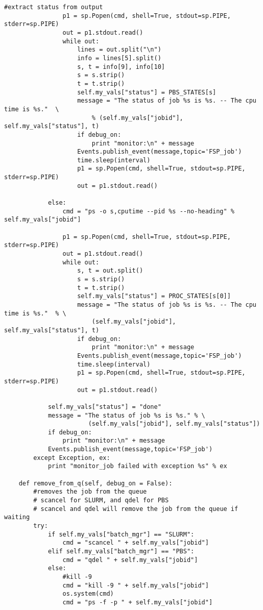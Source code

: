 \begin{lstlisting}[frame=single,
    caption={batch\_mgmt\_script.py}, label=batchscript]
                #extract status from output
                p1 = sp.Popen(cmd, shell=True, stdout=sp.PIPE, stderr=sp.PIPE)
                out = p1.stdout.read()
                while out:
                    lines = out.split("\n")
                    info = lines[5].split()
                    s, t = info[9], info[10]
                    s = s.strip()
                    t = t.strip()
                    self.my_vals["status"] = PBS_STATES[s]
                    message = "The status of job %s is %s. -- The cpu time is %s."  \
                        % (self.my_vals["jobid"], self.my_vals["status"], t)
                    if debug_on:
                        print "monitor:\n" + message
                    Events.publish_event(message,topic='FSP_job')
                    time.sleep(interval)
                    p1 = sp.Popen(cmd, shell=True, stdout=sp.PIPE, stderr=sp.PIPE)
                    out = p1.stdout.read()

            else:
                cmd = "ps -o s,cputime --pid %s --no-heading" %  self.my_vals["jobid"]
                
                p1 = sp.Popen(cmd, shell=True, stdout=sp.PIPE, stderr=sp.PIPE)
                out = p1.stdout.read()
                while out:
                    s, t = out.split()
                    s = s.strip()
                    t = t.strip()
                    self.my_vals["status"] = PROC_STATES[s[0]]
                    message = "The status of job %s is %s. -- The cpu time is %s."  % \
                        (self.my_vals["jobid"], self.my_vals["status"], t)
                    if debug_on:
                        print "monitor:\n" + message
                    Events.publish_event(message,topic='FSP_job')
                    time.sleep(interval)
                    p1 = sp.Popen(cmd, shell=True, stdout=sp.PIPE, stderr=sp.PIPE)
                    out = p1.stdout.read()

            self.my_vals["status"] = "done"
            message = "The status of job %s is %s." % \
                       (self.my_vals["jobid"], self.my_vals["status"])
            if debug_on:
                print "monitor:\n" + message
            Events.publish_event(message,topic='FSP_job')
        except Exception, ex:
            print "monitor_job failed with exception %s" % ex
                
    def remove_from_q(self, debug_on = False):
        #removes the job from the queue
        # scancel for SLURM, and qdel for PBS
        # scancel and qdel will remove the job from the queue if waiting
        try:
            if self.my_vals["batch_mgr"] == "SLURM":
                cmd = "scancel " + self.my_vals["jobid"]
            elif self.my_vals["batch_mgr"] == "PBS":
                cmd = "qdel " + self.my_vals["jobid"]
            else:
                #kill -9
                cmd = "kill -9 " + self.my_vals["jobid"]
                os.system(cmd)                
                cmd = "ps -f -p " + self.my_vals["jobid"]
                

\end{lstlisting}
